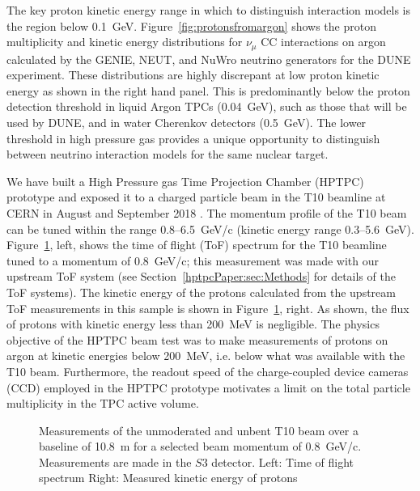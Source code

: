 The key proton kinetic energy range in which to distinguish interaction models is the region below 0.1~GeV.
Figure~\ref{fig:protonsfromargon} shows the proton multiplicity and kinetic energy distributions for $\nu_{\mu}$ CC interactions on argon calculated by the GENIE, NEUT, and NuWro neutrino generators for the DUNE experiment.
These distributions are highly discrepant at low proton kinetic energy as shown in the right hand panel.
This is predominantly below the proton detection threshold in liquid Argon TPCs (0.04~GeV), such as those that will be used by DUNE, and in water Cherenkov detectors (0.5~GeV).
The lower threshold in high pressure gas provides a unique opportunity to distinguish between neutrino interaction models for the same nuclear target.

We have built a High Pressure gas Time Projection Chamber (HPTPC) prototype and exposed it to a charged particle beam in the T10 beamline at CERN in August and September 2018 \cite{SPSC-P-355}.
The momentum profile of the T10 beam can be tuned within the range 0.8--6.5~GeV/c (kinetic energy range 0.3--5.6~GeV). 
Figure~\ref{fig:utofNoBend}, left, shows the time of flight (ToF) spectrum for the T10 beamline tuned to a momentum of 0.8~GeV/c; this measurement was made with our upstream ToF system (see Section~\ref{hptpcPaper:sec:Methods} for details of the ToF systems).
The kinetic energy of the protons calculated from the upstream ToF measurements in this sample is shown in Figure~\ref{fig:utofNoBend}, right.
As shown, the flux of protons with kinetic energy less than 200~MeV is negligible.
The physics objective of the HPTPC beam test was to make measurements of protons on argon at kinetic energies below 200~MeV, i.e. below what was available with the T10 beam. 
Furthermore, the readout speed of the charge-coupled device cameras (CCD) employed in the HPTPC prototype motivates a limit on the total particle multiplicity in the TPC active volume.

\begin{figure}
  \begin{minipage}[t]{0.49\textwidth}
    \centering
    \begin{adjustbox}{max totalsize={\textwidth},center}
      
    \end{adjustbox}
  \end{minipage}
  \hfill
  \begin{minipage}[t]{0.49\textwidth}
    \centering
    \begin{adjustbox}{max totalsize={\textwidth},center}
      
    \end{adjustbox}
  \end{minipage}
  \caption{\label{fig:utofNoBend}Measurements of the unmoderated and unbent T10 beam over a baseline of 10.8~m for a selected beam momentum of 0.8~GeV/c. Measurements are made in the $\mathit{S3}$ detector. Left: Time of flight spectrum Right: Measured kinetic energy of protons}
\end{figure}

